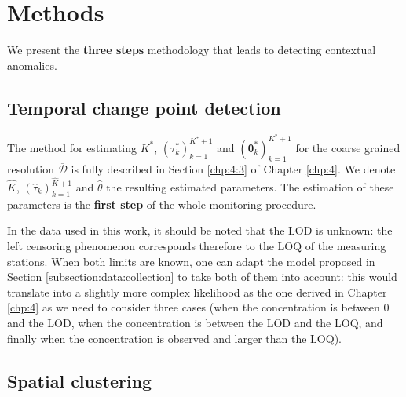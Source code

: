 \section{Methods}\label{section:methods}

We present the \textbf{three steps} methodology that leads to detecting contextual anomalies.   

\subsection{Temporal change point detection}\label{section:timeclust}

The method for estimating $K^*$, $(\tau^*_k)_{k=1}^{K^*+1}$ and $(\bm\theta^*_k)_{k=1}^{K^*+1}$ for the coarse grained resolution $\overline{\mathcal{D}}$ is fully described in Section \ref{chp:4:3} of Chapter \ref{chp:4}. We denote $\widehat{K}$, $(\widehat{\tau}_k)_{k=1}^{\widehat{K}+1}$ and $\widehat{\theta}$ the resulting estimated parameters. The estimation of these parameters is the \textbf{first step} of the whole monitoring procedure.  

In the data used in this work, it should be noted that the LOD is unknown: the left censoring phenomenon corresponds therefore to the LOQ of the measuring stations. When both limits are known, one can adapt the model proposed in Section \ref{subsection:data:collection} to take both of them into account: this would translate into a slightly more complex likelihood as the one derived in Chapter \ref{chp:4} as we need to consider three cases (when the concentration is between 0 and the LOD, when the concentration is between the LOD and the LOQ, and finally when the concentration is observed and larger than the LOQ).  

\subsection{Spatial clustering}\label{section:spaceclust}


